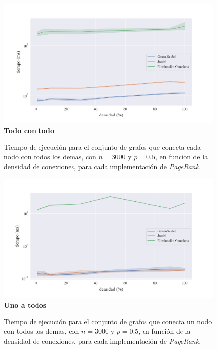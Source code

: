 \begin{figure}[!htbp]
    \centering
    \includegraphics[width=1\textwidth, trim=0 0 0 30]{files/src/.media/densidad_todo_con_todo.png}
    \textbf{Todo con todo}\par
    \caption{Tiempo de ejecución para el conjunto de grafos que conecta cada nodo con todos los demas, con $n = 3000$ y $p = 0.5$, en función de la densidad de conexiones, para cada implementación de \textit{PageRank}.}
    \label{densidad_todo_con_todo}
\end{figure}

\begin{figure}[!htbp]
    \centering
    \includegraphics[width=1\textwidth, trim=0 0 0 30]{files/src/.media/densidad_uno_a_todos.png}
    \textbf{Uno a todos}\par
    \caption{Tiempo de ejecución para el conjunto de grafos que conecta un nodo con todos los demas, con $n = 3000$ y $p = 0.5$, en función de la densidad de conexiones, para cada implementación de \textit{PageRank}.}
    \label{densidad_uno_a_todos}
\end{figure}

